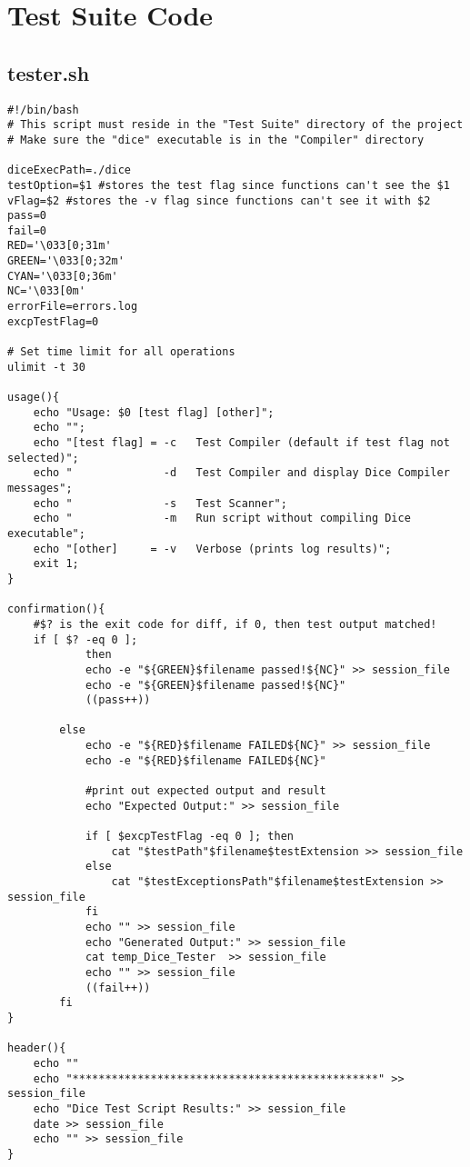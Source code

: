 \section{Test Suite Code}
\subsection{tester.sh}
\begin{verbatim}
#!/bin/bash
# This script must reside in the "Test Suite" directory of the project
# Make sure the "dice" executable is in the "Compiler" directory

diceExecPath=./dice
testOption=$1 #stores the test flag since functions can't see the $1
vFlag=$2 #stores the -v flag since functions can't see it with $2
pass=0
fail=0
RED='\033[0;31m'
GREEN='\033[0;32m'
CYAN='\033[0;36m'
NC='\033[0m'
errorFile=errors.log
excpTestFlag=0

# Set time limit for all operations
ulimit -t 30

usage(){
	echo "Usage: $0 [test flag] [other]";
	echo "";
	echo "[test flag] = -c   Test Compiler (default if test flag not selected)";
	echo "              -d   Test Compiler and display Dice Compiler messages";
	echo "              -s   Test Scanner";
	echo "              -m   Run script without compiling Dice executable";
	echo "[other]     = -v   Verbose (prints log results)";
	exit 1;
}

confirmation(){
	#$? is the exit code for diff, if 0, then test output matched!
	if [ $? -eq 0 ];
			then
			echo -e "${GREEN}$filename passed!${NC}" >> session_file
			echo -e "${GREEN}$filename passed!${NC}"
			((pass++))

		else
			echo -e "${RED}$filename FAILED${NC}" >> session_file
			echo -e "${RED}$filename FAILED${NC}"

			#print out expected output and result
			echo "Expected Output:" >> session_file
			
			if [ $excpTestFlag -eq 0 ];	then
				cat "$testPath"$filename$testExtension >> session_file
			else
				cat "$testExceptionsPath"$filename$testExtension >> session_file
			fi
			echo "" >> session_file
			echo "Generated Output:" >> session_file
			cat temp_Dice_Tester  >> session_file
			echo "" >> session_file
			((fail++))
		fi
}

header(){
	echo ""
	echo "***********************************************" >> session_file
	echo "Dice Test Script Results:" >> session_file
	date >> session_file
	echo "" >> session_file
}


\end{verbatim}
